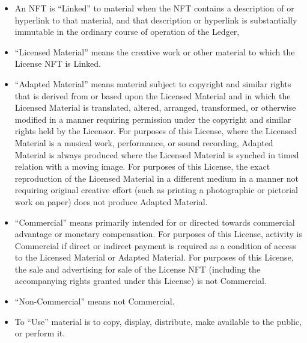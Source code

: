 \documentclass{article}
\newcommand{\subsect}[1]{\vspace{12pt}\noindent{\em{#1}}}
\begin{document}
\begin{sffamily}
\begin{itemize}
	\end{itemize}
		
	\subsect{Licensed and Adapted Material}

	\begin{itemize}
	
	\item	An NFT is ``Linked'' to material when the NFT contains a description of or hyperlink to that material, and that description or hyperlink is substantially immutable in the ordinary course of operation of the Ledger, 

	\item	``Licensed Material'' means the creative work or other material to which the License NFT is Linked.

	\item ``Adapted Material'' means material subject to copyright and similar rights that is derived from or based upon the Licensed Material and in which the Licensed Material is translated, altered, arranged, transformed, or otherwise modified in a manner requiring permission under the copyright and similar rights held by the Licensor. For purposes of this License, where the Licensed Material is a musical work, performance, or sound recording, Adapted Material is always produced where the Licensed Material is synched in timed relation with a moving image. For purposes of this License, the exact reproduction of the Licensed Material in a different medium in a manner not requiring original creative effort (such as printing a photographic or pictorial work on paper) does not produce Adapted Material.

	\item	``Commercial'' means primarily intended for or directed towards commercial advantage or monetary compensation. For purposes of this License, activity is Commercial if direct or indirect payment is required as a condition of access to the Licensed Material or Adapted Material. For purposes of this License, the sale and advertising for sale of the License NFT (including the accompanying rights granted under this License) is not Commercial.

	\item	``Non-Commercial'' means not Commercial.

	\item	To ``Use'' material is to copy, display, distribute, make available to the public, or perform it.

	\end{itemize}


\end{sffamily}
\end{document}
